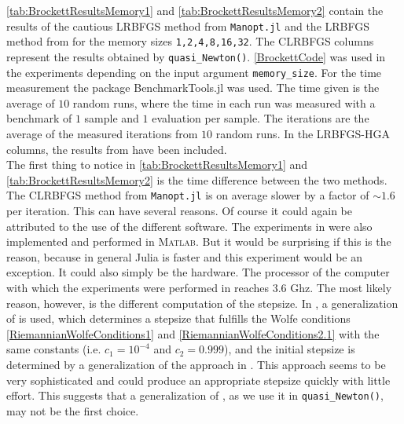 \cref{tab:BrockettResultsMemory1} and \cref{tab:BrockettResultsMemory2} contain the results of the cautious LRBFGS method from \lstinline!Manopt.jl! and the LRBFGS method from \cite{HuangGallivanAbsil:2015} for the memory sizes \lstinline!1,2,4,8,16,32!. The CLRBFGS columns represent the results obtained by \lstinline!quasi_Newton()!. \cref{BrockettCode} was used in the experiments depending on the input argument \lstinline!memory_size!. For the time measurement the package BenchmarkTools.jl was used. The time given is the average of $10$ random runs, where the time in each run was measured with a benchmark of $1$ sample and $1$ evaluation per sample. The iterations are the average of the measured iterations from $10$ random runs. In the LRBFGS-HGA columns, the results from \cite[Table~4]{HuangGallivanAbsil:2015} have been included. \\
The first thing to notice in \cref{tab:BrockettResultsMemory1} and \cref{tab:BrockettResultsMemory2} is the time difference between the two methods. The CLRBFGS method from \lstinline!Manopt.jl! is on average slower by a factor of $\sim 1.6$ per iteration. This can have several reasons. Of course it could again be attributed to the use of the different software. The experiments in \cite{HuangGallivanAbsil:2015} were also implemented and performed in \textsc{Matlab}. But it would be surprising if this is the reason, because in general Julia is faster and this experiment would be an exception. It could also simply be the hardware. The processor of the computer with which the experiments were performed in \cite{HuangGallivanAbsil:2015} reaches 3.6 Ghz. The most likely reason, however, is the different computation of the stepsize. In \cite{HuangGallivanAbsil:2015}, a generalization of \cite[Algorithm~A6.3.1mod]{DennisSchnabel:1996} is used, which determines a stepsize that fulfills the Wolfe conditions \cref{RiemannianWolfeConditions1} and \cref{RiemannianWolfeConditions2.1} with the same constants (i.e. $c_1 = 10^{−4}$ and $c_2 = 0.999$), and the initial stepsize is determined by a generalization of the approach in \cite[p.~60]{NocedalWright:2006}. This approach seems to be very sophisticated and could produce an appropriate stepsize quickly with little effort. This suggests that a generalization of \cite[Algorithmus~9.3]{UlbrichUlbrich:2012}, as we use it in \lstinline!quasi_Newton()!, may not be the first choice. \\
